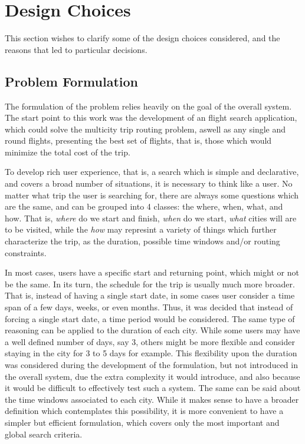 \section{Design Choices}
This section wishes to clarify some of the design choices considered, and the reasons that led to  particular decisions.


\subsection{Problem Formulation}
The formulation of the problem relies heavily on the goal of the overall system.
The start point to this work was the development of an flight search application,
which could solve the multicity trip routing problem,
aswell as any single and round flights,
presenting the best set of flights, that is, those which would minimize 
the total cost of the trip.

To develop rich user experience, that is, a search which is simple and declarative,
and covers a broad number of situations, it is necessary to think like a user.
No matter what trip the user is searching for, there are always some questions which are the same,
and can be grouped into 4 classes: the where, when,  what, and  how.
That is, \textit{where} do we start and finish, 
\textit{when} do we start, \textit{what} cities will are to be visited,
while the \textit{how} may represint a variety of things 
which further characterize the trip, as the duration, possible time windows and/or routing constraints.

In most cases, users have a specific start and returning point, which might or not be the same.
In its turn, the schedule for the trip is usually much more broader.
That is, instead of having a single start date, in some cases user consider a time span of a few days, weeks, or even months. 
Thus, it was decided that instead of forcing a single start date, 
a time period would be considered. 
The same type of reasoning can be applied to the duration of each city.
While some users may have a well defined number of days, say 3,
others might be more flexible and consider staying in the city for 3 to 5 days for example.
This flexibility upon the duration was considered during the development of the formulation,
but not introduced in the overall system, due the extra complexity it would introduce,
and also because it would be difficult to effectively test such a system.
The same can be said about the time windows associated to each city.
While it makes sense to have a broader definition which contemplates
this possibility, it is more convenient to have a simpler but efficient formulation,
which covers only the most important and global search criteria.




